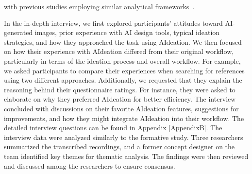 with previous studies employing similar analytical frameworks~\cite{chen2023aircharge}.


In the in-depth interview, we first explored participants' attitudes toward AI-generated images, prior experience with AI design tools, typical ideation strategies, and how they approached the task using AIdeation. We then focused on how their experience with AIdeation differed from their original workflow, particularly in terms of the ideation process and overall workflow. For example, we asked participants to compare their experiences when searching for references using two different approaches. Additionally, we requested that they explain the reasoning behind their questionnaire ratings. For instance, they were asked to elaborate on why they preferred AIdeation for better efficiency. The interview concluded with discussions on their favorite AIdeation features, suggestions for improvements, and how they might integrate AIdeation into their workflow. The detailed interview questions can be found in Appendix \ref{AppendixB}. The interview data were analyzed similarly to the formative study. Three researchers summarized the transcribed recordings, and a former concept designer on the team identified key themes for thematic analysis. The findings were then reviewed and discussed among the researchers to ensure consensus.


